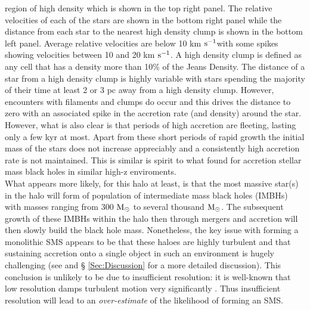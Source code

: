 \documentclass[twocolumn,iop,revtex4]{openjournal}
\newcommand{\kms} {km $\rm{s^{-1}}$}
\newcommand{\msolar} {$\rm{M_{\odot}}~$}
\newcommand{\msolarc} {$\rm{M_{\odot}}$}
\begin{document}
{region of high density which is shown in the top right panel. The relative velocities of each of the stars
are shown in the bottom right panel while the distance from each star to the nearest high density clump is
shown in the bottom left panel. Average relative velocities are below 10 \kms with some spikes showing
velocities between 10 and 20 \kms. A high density clump is defined as any cell that has a density more than
10\% of the  Jeans Density. The distance of a star from a high density clump is highly variable with stars
spending the majority of their time at least 2 or 3 pc away from a high density clump. However, encounters
with filaments and clumps do occur and this drives the distance to zero with an associated spike in
the accretion rate (and density) around the star. However, what is also clear is that periods of high accretion
are fleeting, lasting only a few kyr at most. Apart from these short periods of rapid growth the initial mass of the
stars does not increase appreciably and a consistently high accretion rate is not maintained. This is similar is
spirit to what \cite{Smith_2018} found for accretion stellar mass black holes in similar high-z enviroments.}\\
\indent What appears more likely, for this halo at least, is that the 
most massive star(s) in the halo will form of population of intermediate mass black holes
(IMBHs) with masses ranging from 300 \msolar to several thousand \msolarc.
The subsequent
growth of these IMBHs within the halo then through 
mergers and accretion will then slowly build the black hole mass. 
Nonetheless, the key issue with forming a monolithic SMS appears to be that
these haloes are highly turbulent and that sustaining accretion onto a single
object in such an environment is hugely challenging (see \cite{Chon_2017b} and \S
\ref{Sec:Discussion} for a more detailed discussion).
This conclusion is unlikely to be due to insufficient resolution: it is
well-known that low resolution damps turbulent motion very significantly
\citep[e.g.][]{Federrath_2010a, Downes_2012}. Thus insufficient resolution
will lead to an {\it over-estimate} of the likelihood of forming an SMS.
\end{document}
